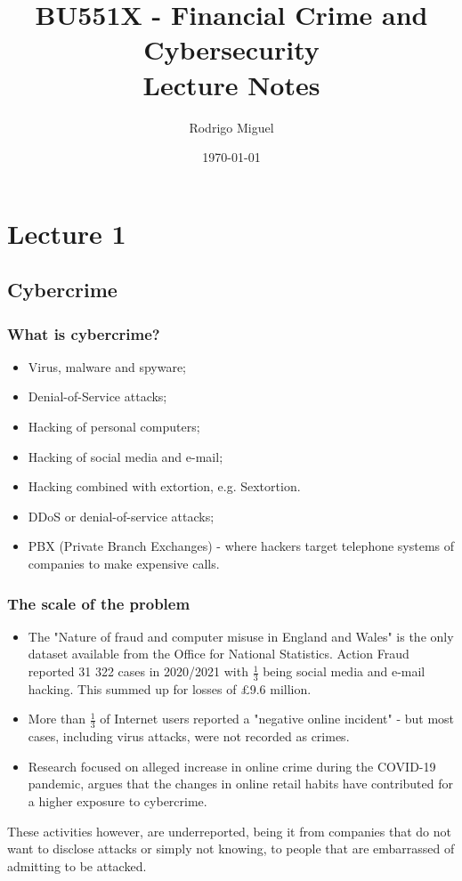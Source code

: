 \documentclass[11pt,a4paper]{report}
\title{BU551X - Financial Crime and Cybersecurity \\ Lecture Notes}
\author{Rodrigo Miguel}
\date{\today}
\begin{document}
\maketitle
\tableofcontents

\chapter{Lecture 1}
\section{Cybercrime}
\subsection{What is cybercrime?}
\begin{itemize}
    \item Virus, malware and spyware;
    \item Denial-of-Service attacks;
    \item Hacking of personal computers;
    \item Hacking of social media and e-mail;
    \item Hacking combined with extortion, e.g. Sextortion.
    \item DDoS or denial-of-service attacks;
    \item PBX (Private Branch Exchanges) - where hackers target telephone systems of companies to make expensive calls.
\end{itemize}
\subsection{The scale of the problem}
\begin{itemize}
    \item The "Nature of fraud and computer misuse in England and Wales" is the only dataset available from the Office for National Statistics.  Action Fraud reported 31 322 cases in 2020/2021 with $\frac{1}{3}$ being social media and e-mail hacking. This summed up for losses of £9.6 million.
    \item More than $\frac{1}{3}$ of Internet users reported a "negative online incident" - but most cases, including virus attacks, were not recorded as crimes.
    \item Research focused on alleged increase in online crime during the COVID-19 pandemic, argues that the changes in online retail habits have contributed for a higher exposure to cybercrime.
\end{itemize}
These activities however, are underreported, being it from companies that do not want to disclose attacks or simply not knowing, to people that are embarrassed of admitting to be attacked.
\end{document}
